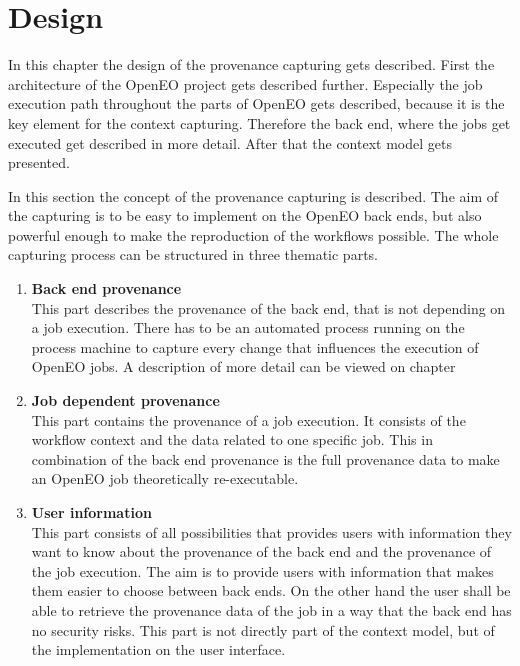 \documentclass[draft,final]{vutinfth} %
\begin{document}
\chapter{Design}
In this chapter the design of the provenance capturing gets described. First the architecture of the OpenEO project gets described further. Especially the job execution path throughout the parts of OpenEO gets described, because it is the key element for the context capturing. Therefore the back end, where the jobs get executed get described in more detail. After that the context model gets presented. %

In this section the concept of the provenance capturing is described. The aim of the capturing is to be easy to implement on the OpenEO back ends, but also powerful enough to make the reproduction of the workflows possible. The whole capturing process can be structured in three thematic parts.
\begin{enumerate}
	\item \textbf{Back end provenance} \\
	This part describes the provenance of the back end, that is not depending on a job execution. There has to be an automated process running on the process machine to capture every change that influences the execution of OpenEO jobs. A description of more detail can be viewed on chapter %
	\item\textbf{Job dependent provenance} \\
	This part contains the provenance of a job execution. It consists of the workflow context and the data related to one specific job. This in combination of the back end provenance is the full provenance data to make an OpenEO job theoretically re-executable.
	\item \textbf{User information} \\
	This part consists of all possibilities that provides users with information they want to know about the provenance of the back end and the provenance of the job execution. The aim is to provide users with information that makes them easier to choose between back ends. On the other hand the user shall be able to retrieve the provenance data of the job in a way that the back end has no security risks. This part is not directly part of the context model, but of the implementation on the user interface.
\end{enumerate}
\end{document}
